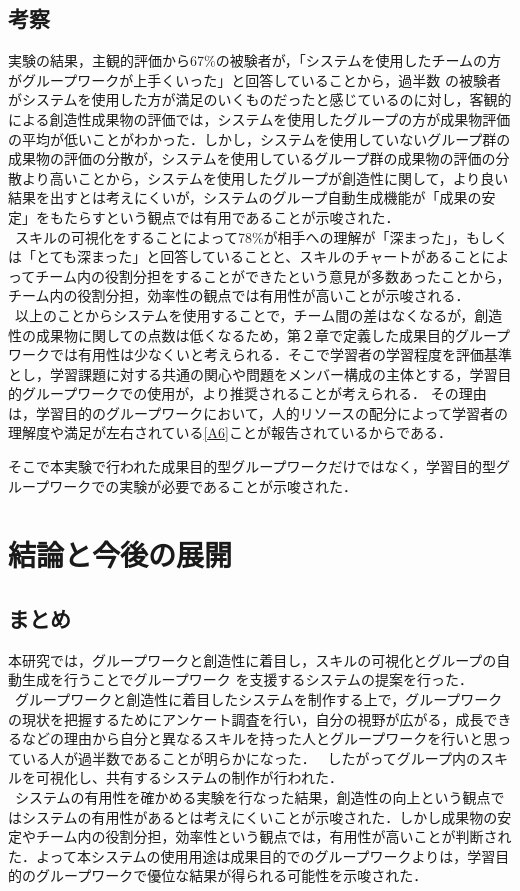 \documentclass{funthesis}
\begin{document}
\section{考察}
実験の結果，主観的評価から67\%の被験者が，「システムを使用したチームの方がグループワークが上手くいった」と回答していることから，過半数
の被験者がシステムを使用した方が満足のいくものだったと感じているのに対し，客観的による創造性成果物の評価では，システムを使用したグループの方が成果物評価の平均が低いことがわかった．しかし，システムを使用していないグループ群の成果物の評価の分散が，システムを使用しているグループ群の成果物の評価の分散より高いことから，システムを使用したグループが創造性に関して，より良い結果を出すとは考えにくいが，システムのグループ自動生成機能が「成果の安定」をもたらすという観点では有用であることが示唆された．\\
\ スキルの可視化をすることによって78\%が相手への理解が「深まった」，もしくは「とても深まった」と回答していることと、スキルのチャートがあることによってチーム内の役割分担をすることができたという意見が多数あったことから，チーム内の役割分担，効率性の観点では有用性が高いことが示唆される．\\
\ 以上のことからシステムを使用することで，チーム間の差はなくなるが，創造性の成果物に関しての点数は低くなるため，第２章で定義した成果目的グループワークでは有用性は少なくいと考えられる．そこで学習者の学習程度を評価基準とし，学習課題に対する共通の関心や問題をメンバー構成の主体とする，学習目的グループワークでの使用が，より推奨されることが考えられる． その理由は，学習目的のグループワークにおいて，人的リソースの配分によって学習者の理解度や満足が左右されている\ref{A6}ことが報告されているからである．

そこで本実験で行われた成果目的型グループワークだけではなく，学習目的型グループワークでの実験が必要であることが示唆された．


\chapter{結論と今後の展開}
\section{まとめ}
本研究では，グループワークと創造性に着目し，スキルの可視化とグループの自動生成を行うことでグループワーク
を支援するシステムの提案を行った．\\
\ グループワークと創造性に着目したシステムを制作する上で，グループワークの現状を把握するためにアンケート調査を行い，自分の視野が広がる，成長できるなどの理由から自分と異なるスキルを持った人とグループワークを行いと思っている人が過半数であることが明らかになった．
\ したがってグループ内のスキルを可視化し、共有するシステムの制作が行われた．\\
\ システムの有用性を確かめる実験を行なった結果，創造性の向上という観点ではシステムの有用性があるとは考えにくいことが示唆された．しかし成果物の安定やチーム内の役割分担，効率性という観点では，有用性が高いことが判断された．よって本システムの使用用途は成果目的でのグループワークよりは，学習目的のグループワークで優位な結果が得られる可能性を示唆された．
\end{document}
